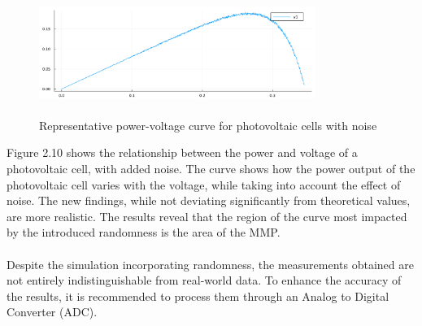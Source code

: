 \documentclass{report}
\begin{document}
\begin{figure}[h!]
    \centering
    \includegraphics[width=9cm, height=4cm] {sd.pdf}
    \caption{Representative power-voltage curve for photovoltaic cells with noise}
    \label{fig:my_label}
\end{figure}
\newpage
\hfill \break
Figure 2.10 shows the relationship between the power and voltage of a photovoltaic cell, with added noise. The curve shows how the power output of the photovoltaic cell varies with the voltage, while taking into account the effect of noise. 
\hfill \break
The new findings, while not deviating significantly from theoretical values, are more realistic. The results reveal that the region of the curve most impacted by the introduced randomness is the area of the MMP.\\
\\
Despite the simulation incorporating randomness, the measurements obtained are not entirely indistinguishable from real-world data. To enhance the accuracy of the results, it is recommended to process them through an Analog to Digital Converter (ADC)\cite{texbook4}.
\end{document}
